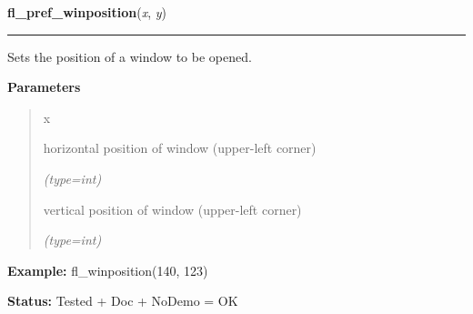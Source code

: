 \hspace{.8\funcindent}\begin{boxedminipage}{\funcwidth}

    \raggedright \textbf{fl\_pref\_winposition}(\textit{x}, \textit{y})

    \vspace{-1.5ex}

    \rule{\textwidth}{0.5\fboxrule}
\setlength{\parskip}{2ex}
    Sets the position of a window to be opened.

\setlength{\parskip}{1ex}
      \textbf{Parameters}
      \vspace{-1ex}

      \begin{quote}
        \begin{Ventry}{x}

          \item[x]

          horizontal position of window (upper-left corner)

            {\it (type=int)}

          \item[y]

          vertical position of window (upper-left corner)

            {\it (type=int)}

        \end{Ventry}

      \end{quote}

\textbf{Example:} fl\_winposition(140, 123)



\textbf{Status:} Tested + Doc + NoDemo = OK



    \end{boxedminipage}

    \label{xformslib:flxbasic:fl_winminsize}

    \vspace{0.5ex}

